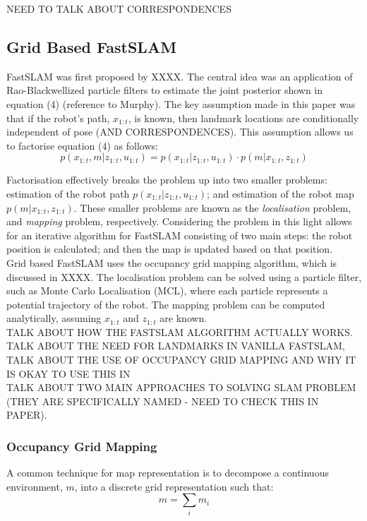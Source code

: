 \documentclass[a4paper]{article}
\begin{document}
NEED TO TALK ABOUT CORRESPONDENCES

\subsection{Grid Based FastSLAM}
FastSLAM was first proposed by XXXX. The central idea was an application of Rao-Blackwellized particle filters to estimate the joint posterior shown in equation (4) (reference to Murphy). The key assumption made in this paper was that if the robot's path, $x_{1:t}$, is known, then landmark locations are conditionally independent of pose (AND CORRESPONDENCES). This assumption allows us to factorise equation (4) as follows:
\begin{equation}
p(x_{1:t}, m | z_{1:t}, u_{1:t}) = p(x_{1:t} | z_{1:t}, u_{1:t}) \cdot p(m | x_{1:t}, z_{1:t})
\end{equation}

Factorisation effectively breaks the problem up into two smaller problems: estimation of the robot path $p(x_{1:t} | z_{1:t}, u_{1:t})$; and estimation of the robot map $p(m | x_{1:t}, z_{1:t})$. These smaller problems are known as the \textit{localisation} problem, and \textit{mapping} problem, respectively. Considering the problem in this light allows for an iterative algorithm for FastSLAM consisting of two main steps: the robot position is calculated; and then the map is updated based on that position.\\

Grid based FastSLAM uses the occupancy grid mapping algorithm, which is discussed in XXXX. The localisation problem can be solved using a particle filter, such as Monte Carlo Localisation (MCL), where each particle represents a potential trajectory of the robot. The mapping problem can be computed analytically, assuming $x_{1:t}$ and $z_{1:t}$ are known.\\

TALK ABOUT HOW THE FASTSLAM ALGORITHM ACTUALLY WORKS.\\

TALK ABOUT THE NEED FOR LANDMARKS IN VANILLA FASTSLAM, TALK ABOUT THE USE OF OCCUPANCY GRID MAPPING AND WHY IT IS OKAY TO USE THIS IN\\

TALK ABOUT TWO MAIN APPROACHES TO SOLVING SLAM PROBLEM (THEY ARE SPECIFICALLY NAMED - NEED TO CHECK THIS IN PAPER).\\

\subsubsection{Occupancy Grid Mapping}
A common technique for map representation is to decompose a continuous environment, $m$, into a discrete grid representation such that:
\begin{equation}
m = \sum_{i} m_i
\end{equation}
\end{document}
